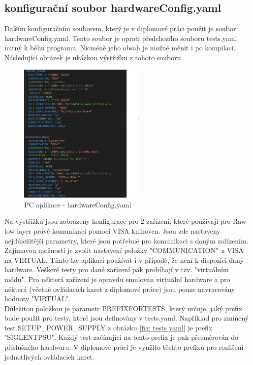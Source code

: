 \subsection{konfigurační soubor hardwareConfig.yaml}
Dalším konfiguračním souborem, který je v diplomové práci použit je soubor hardwareConfig.yaml. Tento soubor je oproti
předchozího souboru tests.yaml nutný k běhu programu. Nicméně jeho obsah je možné měnit i po kompilaci.
Následující obrázek je ukázkou výstřižku z tohoto souboru.
\begin{figure}[ht!]
    \centering
    \includegraphics[width = 0.55\textwidth]{obrazky/hardwareConfig.png}
    \caption{PC aplikace - hardwareConfig.yaml}
    \label{fig: hardwareConfig yaml}
\end{figure}
\clearpage

Na výstřižku jsou zobrazeny konfigurace pro 2 zařízení, které používají pro Raw low layer právě komunikaci pomocí VISA knihoven.
Jsou zde nastaveny nejdůležitější parametry, které jsou potřebné pro komunikaci s daným zařízením. Zajímavou možností je zvolit
nastavení položky "COMMUNICATION"\ z VISA na VIRTUAL. Tímto lze aplikaci používat i v případě, že není k dispozici daný hardware.
Veškeré testy pro dané zařízení pak probíhají v tzv. "virtuálním módu". Pro některá zařízení je opravdu emulován virtuální hardware
a pro některá (včetně ovládacích karet z diplomové práce) jsou pouze navracovány hodnoty "VIRTUAL".\\

Důležitou položkou je parametr PREFIXFORTESTS, který určuje, jaký prefix bude použit pro testy, které jsou definovány v tests.yaml.
Například pro zmíňený test\linebreak
SETUP\_POWER\_SUPPLY z obrázku \ref{fig: tests yaml} je prefix "SIGLENTPSU". Každý test začínající na tento
prefix je pak přesměrován do příslušného hardwaru. V diplomové práci je využito těchto prefixů pro rozlišení jednotlivých ovládacích karet.

